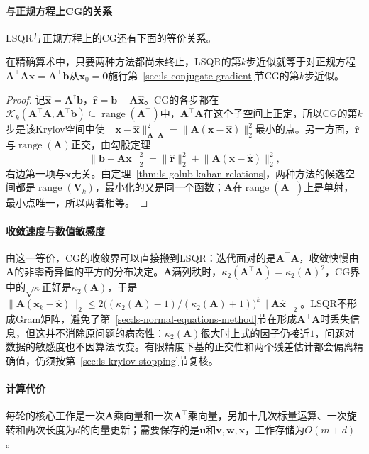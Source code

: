 \paragraph{与正规方程上CG的关系}
LSQR与正规方程上的CG还有下面的等价关系。

\begin{theorem}[LSQR与正规方程上的CG]
\label{thm:ls-lsqr-cg-equivalence}
在精确算术中，只要两种方法都尚未终止，LSQR的第$k$步近似就等于对正规方程$\bm A^\top\bm A\bm x=\bm A^\top\bm b$从$\bm x_0=\bm0$施行第~\ref{sec:ls-conjugate-gradient}节CG的第$k$步近似。
\end{theorem}

\begin{proof}
记$\hat{\bm x}=\bm A^\dagger\bm b$，$\hat{\bm r}=\bm b-\bm A\hat{\bm x}$。CG的各步都在$\mathcal K_k(\bm A^\top\bm A,\bm A^\top\bm b)\subseteq\operatorname{range}(\bm A^\top)$中，$\bm A^\top\bm A$在这个子空间上正定，所以CG的第$k$步是该Krylov空间中使$\lVert\bm x-\hat{\bm x}\rVert_{\bm A^\top\bm A}^2=\lVert\bm A(\bm x-\hat{\bm x})\rVert_2^2$最小的点。另一方面，$\hat{\bm r}$与$\operatorname{range}(\bm A)$正交，由勾股定理
\[
 \lVert\bm b-\bm A\bm x\rVert_2^2=\lVert\hat{\bm r}\rVert_2^2+\lVert\bm A(\bm x-\hat{\bm x})\rVert_2^2 ,
\]
右边第一项与$\bm x$无关。由定理~\ref{thm:ls-golub-kahan-relations}，两种方法的候选空间都是$\operatorname{range}(\bm V_k)$，最小化的又是同一个函数；$\bm A$在$\operatorname{range}(\bm A^\top)$上是单射，最小点唯一，所以两者相等。
\end{proof}

\paragraph{收敛速度与数值敏感度}
由这一等价，CG的收敛界可以直接搬到LSQR：迭代面对的是$\bm A^\top\bm A$，收敛快慢由$\bm A$的非零奇异值的平方的分布决定。$\bm A$满列秩时，$\kappa_2(\bm A^\top\bm A)=\kappa_2(\bm A)^2$，CG界中的$\sqrt{\kappa}$正好是$\kappa_2(\bm A)$，于是$\lVert\bm A(\bm x_k-\hat{\bm x})\rVert_2\le2\bigl((\kappa_2(\bm A)-1)/(\kappa_2(\bm A)+1)\bigr)^k\lVert\bm A\hat{\bm x}\rVert_2$。LSQR不形成Gram矩阵，避免了第~\ref{sec:ls-normal-equations-method}节在形成$\bm A^\top\bm A$时丢失信息，但这并不消除原问题的病态性：$\kappa_2(\bm A)$很大时上式的因子仍接近$1$，问题对数据的敏感度也不因算法改变。有限精度下基的正交性和两个残差估计都会偏离精确值，仍须按第~\ref{sec:ls-krylov-stopping}节复核。

\paragraph{计算代价}
每轮的核心工作是一次$\bm A$乘向量和一次$\bm A^\top$乘向量，另加十几次标量运算、一次旋转和两次长度为$d$的向量更新；需要保存的是$\bm u$和$\bm v,\bm w,\bm x$，工作存储为$O(m+d)$。

